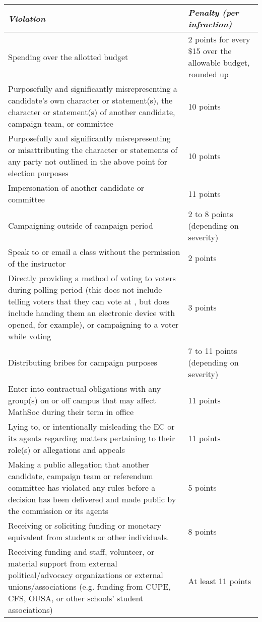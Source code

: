 \begin{center}
	\begin{tabular}{| p{11.5cm} | p{4cm} |}
		\hline
		\rowcolor{lightgray} \textit{\textbf{Violation}} & \textit{\textbf{Penalty (per infraction)}}  \\ 
		\hline
		Spending over the allotted budget & 2 points for every \$15 over the allowable budget, rounded up\\  
		\hline
		Purposefully and significantly misrepresenting a candidate’s own character or statement(s), the character or statement(s) of another candidate, campaign team, or committee & 10 points \\
		\hline
		Purposefully and significantly misrepresenting or misattributing the character or statements of any party not outlined in the above point for election purposes & 10 points \\
		\hline 
		Impersonation of another candidate or committee & 11 points \\
		\hline
		Campaigning outside of campaign period & 2 to 8 points (depending on severity) \\
		\hline
		Speak to or email a class without the permission of the instructor & 2 points \\
		\hline
		Directly providing a method of voting to voters during polling period (this does not include telling voters that they can vote at \votewebsite, but does include handing them an electronic device with \votewebsite{} opened, for example), or campaigning to a voter while voting & 3 points \\
		\hline
		Distributing bribes for campaign purposes & 7 to 11 points (depending on severity) \\
		\hline
		Enter into contractual obligations with any group(s) on or off campus that may affect MathSoc during their term in office & 11 points \\
		\hline 
		Lying to, or intentionally misleading the EC or its agents regarding matters pertaining to their role(s) or allegations and appeals & 11 points \\
		\hline
		Making a public allegation that another candidate, campaign team or referendum committee has violated any rules before a decision has been delivered and made public by the commission or its agents & 5 points \\
		\hline
		Receiving or soliciting funding or monetary equivalent from students or other individuals. & 8 points \\
		\hline 
		Receiving funding and staff, volunteer, or material support from external political/advocacy organizations or external unions/associations (e.g. funding from CUPE, CFS, OUSA, or other schools’ student associations) & At least 11 points \\

\end{tabular}
\end{center}
